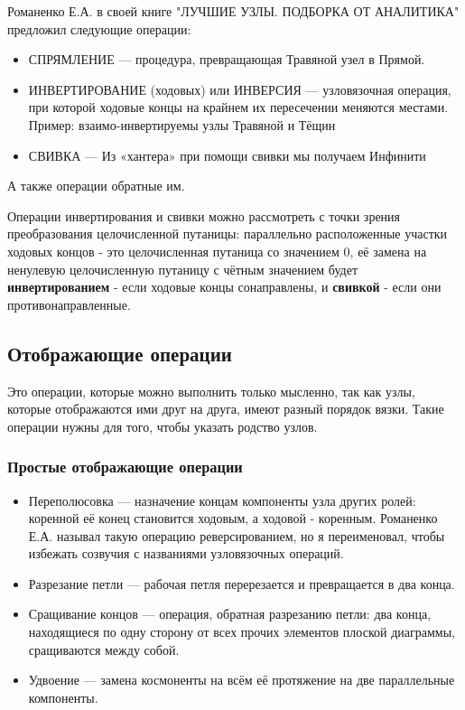Романенко Е.А. в своей книге "ЛУЧШИЕ УЗЛЫ. ПОДБОРКА ОТ АНАЛИТИКА" предложил следующие операции:
\begin{itemize}
\item СПРЯМЛЕНИЕ --– процедура, превращающая Травяной узел в Прямой. 
\item ИНВЕРТИРОВАНИЕ (ходовых) или ИНВЕРСИЯ –-- узловязочная операция, при которой ходовые концы на крайнем их пересечении меняются местами. Пример: взаимо-инвертируемы узлы Травяной и Тёщин 
\item СВИВКА --- Из «хантера» при помощи свивки мы получаем Инфинити
\end{itemize}
А также операции обратные им.


Операции инвертирования и свивки можно рассмотреть с точки зрения преобразования целочисленной путаницы: параллельно расположенные участки ходовых концов - это целочисленная путаница со значением 0, её замена на ненулевую целочисленную путаницу с чётным значением будет \textbf{инвертированием} - если ходовые концы сонаправлены, и \textbf{свивкой} - если они противонаправленные.

\subsection{Отображающие операции}

Это операции, которые можно выполнить только мысленно, так как узлы, которые отображаются ими друг на друга, имеют разный порядок вязки. Такие операции нужны для того, чтобы указать родство узлов.

\subsubsection{Простые отображающие операции}
\begin{itemize}
\item Переполюсовка --- назначение концам компоненты узла других ролей: коренной её конец становится ходовым, а ходовой - коренным. Романенко Е.А. называл такую операцию реверсированием, но я переименовал, чтобы избежать созвучия с названиями узловязочных операций.
\item Разрезание петли --- рабочая петля перерезается и превращается в два конца.
\item Сращивание концов --- операция, обратная разрезанию петли: два конца, находящиеся по одну сторону от всех прочих элементов плоской диаграммы, сращиваются между собой.
\item Удвоение --- замена космоненты на всём её протяжение на две параллельные компоненты.
\end{itemize}

